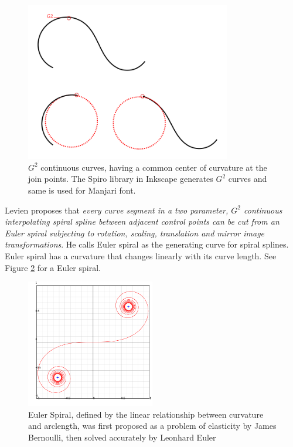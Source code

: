 \documentclass[11pt,twoside,a4paper,parskip=half]{scrartcl}
\begin{document}
\begin{figure}[h!]
	\includegraphics[width=0.8\textwidth]{images/g2.png}
	\caption{$G^2$ continuous curves, having a common center of curvature at the join points. The Spiro library in Inkscape generates $G^2$ curves and same is used for Manjari font.}
	\label{g2}
\end{figure}

Levien proposes that \textit{every curve segment in a two parameter,  $G^2$ continuous interpolating spiral spline between adjacent control points can be cut from an Euler spiral subjecting to rotation, scaling, translation and mirror image transformations}. He calls Euler spiral as the generating curve for spiral splines. Euler spiral has a curvature that changes linearly with its curve length. See Figure \ref{eulerspiral} for a Euler spiral.


\begin{figure}
	\includegraphics[width=0.5\textwidth]{images/Euler_spiral.png}
	\caption{Euler Spiral, defined by the linear relationship between curvature and arclength, was first proposed as a problem of elasticity by James Bernoulli, then solved accurately by Leonhard Euler}
	\label{eulerspiral}
\end{figure}
\end{document}
